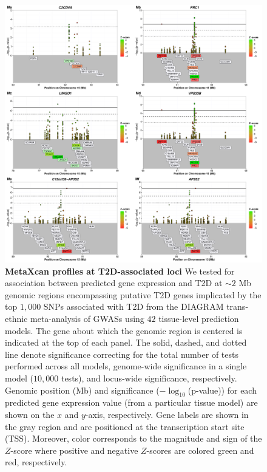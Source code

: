 \documentclass[10pt]{article}
\begin{document}
\begin{figure}
\ContinuedFloat
\includegraphics[width=\textwidth]{sup_fig1_part13_locusArray.pdf}
	\caption{\textbf{MetaXcan profiles at T2D-associated loci} We tested for association between predicted gene expression and T2D at $\sim2$ Mb genomic regions encompassing putative T2D genes implicated by the top $1,000$ SNPs associated with T2D from the DIAGRAM trans-ethnic meta-analysis of GWASs using $42$ tissue-level prediction models. The gene about which the genomic region is centered is indicated at the top of each panel. The solid, dashed, and dotted line denote significance correcting for the total number of tests performed across all models, genome-wide significance in a single model ($10,000$ tests), and locus-wide significance, respectively. Genomic position (Mb) and significance ($-\log_{10}$(p-value)) for each predicted gene expression value (from a particular tissue model) are shown on the $x$ and $y$-axis, respectively. Gene labels are shown in the gray region and are positioned at the transcription start site (TSS). Moreover, color corresponds to the magnitude and sign of the $Z$-score where positive and negative $Z$-scores are colored green and red, respectively.} 
    \label{fig:supp.locus_array_fig1_part13}
\end{figure}
\end{document}
